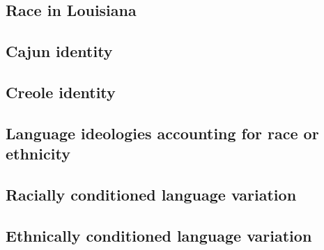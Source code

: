     \subsection{Race in Louisiana}
    \subsection{Cajun identity}
    \subsection{Creole identity}
    \subsection{Language ideologies accounting for race or ethnicity}
    \subsection{Racially conditioned language variation}
    \subsection{Ethnically conditioned language variation}
